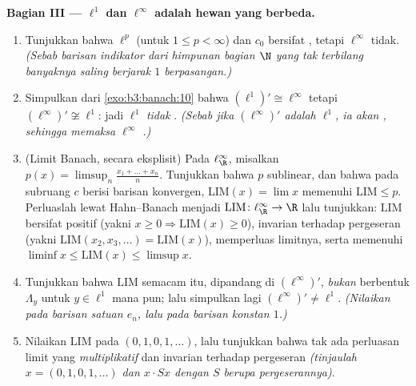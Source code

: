 \begin{problem}[{Soal akhir pekan --- $(\ell^p)' = \ell^q$,
kerefleksifan, dan keanehan $\ell^\infty$}]
\medskip
\noindent\textbf{Bagian III --- $\ell^1$ dan $\ell^\infty$ adalah
hewan yang berbeda.}
\begin{enumerate}[resume]
  \item Tunjukkan bahwa $\ell^p$ (untuk $1 \leq p < \infty$) dan $c_0$ bersifat
        , tetapi $\ell^\infty$ tidak. \emph{(Sebab
        barisan indikator dari himpunan bagian $\N$ yang tak terbilang banyaknya
        saling berjarak $1$ berpasangan.)}
  \item Simpulkan dari \cref{exo:b3:banach:10} bahwa $(\ell^1)'
        \cong \ell^\infty$ tetapi $(\ell^\infty)' \not\cong
        \ell^1$: jadi $\ell^1$ \emph{tidak} .
        \emph{(Sebab jika $(\ell^\infty)'$ adalah $\ell^1$, ia akan
        , sehingga memaksa $\ell^\infty$ .)}
  \item (Limit Banach, secara eksplisit) Pada $\ell^\infty_\R$, misalkan
        $p(x) = \limsup_n \frac{x_1 + \dots + x_n}{n}$. Tunjukkan
        bahwa $p$ sublinear, dan bahwa pada subruang $c$ berisi
        barisan konvergen, $\mathrm{LIM}(x) = \lim x$
        memenuhi $\mathrm{LIM} \leq p$. Perluaslah lewat Hahn--Banach
        menjadi $\mathrm{LIM} \colon \ell^\infty_\R \to \R$ lalu tunjukkan:
        $\mathrm{LIM}$ bersifat positif (yakni $x \geq 0 \Rightarrow
        \mathrm{LIM}(x) \geq 0$), invarian terhadap pergeseran
        (yakni $\mathrm{LIM}(x_2, x_3, \dots) = \mathrm{LIM}(x)$),
        memperluas limitnya, serta memenuhi $\liminf x \leq
        \mathrm{LIM}(x)\leq \limsup x$.
  \item Tunjukkan bahwa $\mathrm{LIM}$ semacam itu, dipandang di
        $(\ell^\infty)'$, \emph{bukan} berbentuk $\Lambda_y$
        untuk $y \in \ell^1$ mana pun; lalu simpulkan lagi $(\ell^\infty)'
        \neq \ell^1$. \emph{(Nilaikan pada barisan satuan
        $e_n$, lalu pada barisan konstan $1$.)}
  \item Nilaikan $\mathrm{LIM}$ pada $(0,1,0,1,\dots)$, lalu tunjukkan
        bahwa tak ada perluasan limit yang \emph{multiplikatif} dan
        invarian terhadap pergeseran \emph{(tinjaulah $x =
        (0,1,0,1,\dots)$ dan $x\cdot Sx$ dengan $S$ berupa
        pergeserannya)}.
\end{enumerate}


\end{problem}
